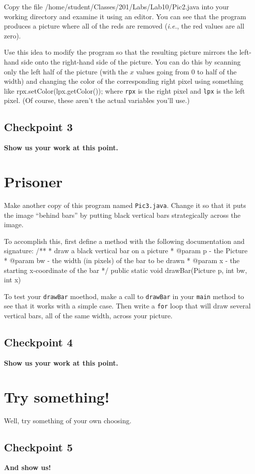 \documentclass[12pt]{article}
\newenvironment{qv}%
  {\quote
   \verbatim}%
  {\endverbatim
   \endquote}
\begin{document}
Copy the file
\begin{qv}
/home/student/Classes/201/Labs/Lab10/Pic2.java
\end{qv}
into your working directory
and examine it using an editor.
You can see that the program produces a picture
where all of the reds are removed
({\em i.e.}, the red values are all zero).

Use this idea to modify the program
so that the resulting picture mirrors the left-hand side
onto the right-hand side of the picture.
You can do this by scanning only the left half of the picture
(with the $x$ values going from 0 to half of the width)
and changing the color of the corresponding right pixel
using something like
\begin{qv}
rpx.setColor(lpx.getColor());
\end{qv}
where \verb'rpx' is the right pixel
and \verb'lpx' is the left pixel.
(Of course, these aren't the actual variables you'll use.)

\subsection*{Checkpoint 3}
{\bf
Show us your work at this point.
}

\section*{Prisoner}
Make another copy of this program named \verb'Pic3.java'.
Change it so that it puts the image ``behind bars''
by putting black vertical bars strategically
across the image.

To accomplish this, first define a method
with the following documentation and signature:
\begin{qv}
/**
 * draw a black vertical bar on a picture
 * @param p  - the Picture
 * @param bw - the width (in pixels) of the bar to be drawn
 * @param x  - the starting x-coordinate of the bar
 */
public static void drawBar(Picture p, int bw, int x)
\end{qv}

To test your \verb'drawBar' moethod,
make a call to \verb'drawBar' in your \verb'main' method
to see that it works with a simple case.
Then write a \verb'for' loop that will draw several vertical bars,
all of the same width, across your picture.

\subsection*{Checkpoint 4}
{\bf
Show us your work at this point.
}

\section*{Try something!}
Well, try something of your own choosing.
\subsection*{Checkpoint 5}
{\bf
And show us!
}
\end{document}

